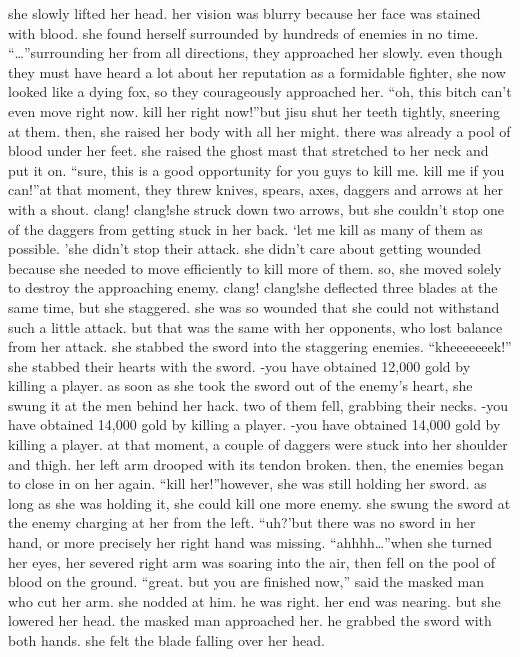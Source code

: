 she slowly lifted her head.
 her vision was blurry because her face was stained with blood.
 she found herself surrounded by hundreds of enemies in no time.
“…”surrounding her from all directions, they approached her slowly.
even though they must have heard a lot about her reputation as a formidable fighter, she now looked like a dying fox, so they courageously approached her.
“oh, this bitch can’t even move right now.
 kill her right now!”but jisu shut her teeth tightly, sneering at them.
 then, she raised her body with all her might.
 there was already a pool of blood under her feet.
she raised the ghost mast that stretched to her neck and put it on.
“sure, this is a good opportunity for you guys to kill me.
 kill me if you can!”at that moment, they threw knives, spears, axes, daggers and arrows at her with a shout.
clang! clang!she struck down two arrows, but she couldn’t stop one of the daggers from getting stuck in her back.
‘let me kill as many of them as possible.
’she didn’t stop their attack.
 she didn’t care about getting wounded because she needed to move efficiently to kill more of them.
 so, she moved solely to destroy the approaching enemy.
clang! clang!she deflected three blades at the same time, but she staggered.
 she was so wounded that she could not withstand such a little attack.
but that was the same with her opponents, who lost balance from her attack.
she stabbed the sword into the staggering enemies.
“kheeeeeeek!”
she stabbed their hearts with the sword.
-you have obtained 12,000 gold by killing a player.
as soon as she took the sword out of the enemy’s heart, she swung it at the men behind her hack.
 two of them fell, grabbing their necks.
-you have obtained 14,000 gold by killing a player.
-you have obtained 14,000 gold by killing a player.
at that moment, a couple of daggers were stuck into her shoulder and thigh.
 her left arm drooped with its tendon broken.
 then, the enemies began to close in on her again.
“kill her!”however, she was still holding her sword.
 as long as she was holding it, she could kill one more enemy.
 she swung the sword at the enemy charging at her from the left.
“uh?’but there was no sword in her hand, or more precisely her right hand was missing.
“ahhhh…”when she turned her eyes, her severed right arm was soaring into the air, then fell on the pool of blood on the ground.
“great.
 but you are finished now,” said the masked man who cut her arm.
she nodded at him.
 he was right.
 her end was nearing.
but she lowered her head.
 the masked man approached her.
 he grabbed the sword with both hands.
 she felt the blade falling over her head.
